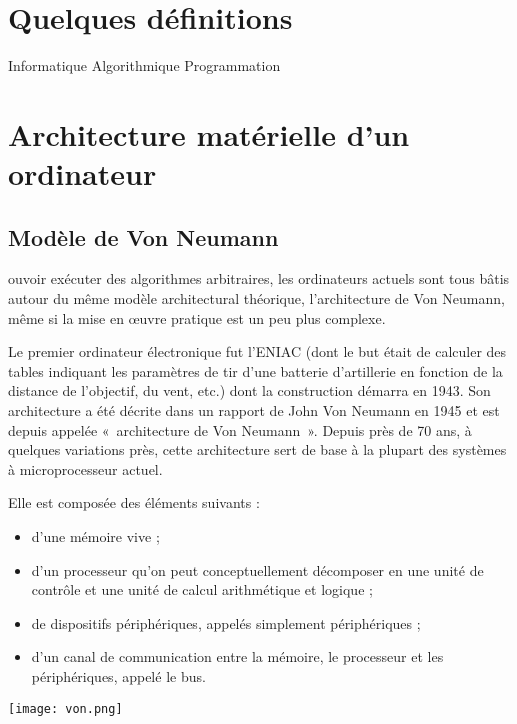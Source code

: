 \section{Quelques définitions}
Informatique
Algorithmique
Programmation

\section{Architecture matérielle d'un ordinateur}
\subsection{Modèle de Von Neumann}

 ouvoir exécuter des algorithmes arbitraires, les ordinateurs actuels sont tous bâtis
autour du même modèle architectural théorique, l’architecture de Von Neumann, même
si la mise en œuvre pratique est un peu plus complexe.

Le premier ordinateur électronique fut l’ENIAC
(dont le but était de calculer des tables indiquant les paramètres de tir d’une batterie d’artillerie
en fonction de la distance de l’objectif, du vent, etc.) dont la construction démarra
en 1943. 
Son architecture a été décrite dans un rapport de John Von Neumann en 1945 et
est depuis appelée «~architecture de Von Neumann~». Depuis près de 70 ans, à quelques variations
près, cette  architecture sert de base à la plupart des systèmes à microprocesseur actuel. 

\begin{minipage}[c]{.49\linewidth}
Elle est composée des éléments suivants :
\begin{itemize}
\item d'une mémoire vive ;
\item d'un processeur qu'on peut conceptuellement décomposer en une unité de contrôle et
une unité de calcul arithmétique et logique ;
\item de dispositifs périphériques, appelés simplement périphériques ;
\item d'un canal de communication entre la mémoire, le processeur et les périphériques, appelé
le bus.
\end{itemize}
\end{minipage} \hfill
\begin{minipage}[c]{.49\linewidth}
\begin{center}
\texttt{[image: von.png]}
\end{center}
\end{minipage}

